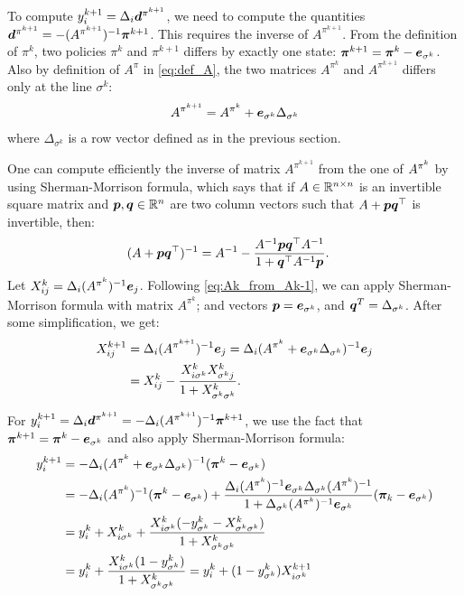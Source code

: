 \documentclass[acmsmall,screen,anonymous]{acmart}
\begin{document}
To compute $y^{k+1}_i=\Delta_{i}\boldsymbol{d}^{\pi^{k+1}}$, we need to compute the quantities $\boldsymbol{d}^{\pi^{k+1}} = -(A^{\pi^{k+1}})^{-1}\boldsymbol{\pi}^{k+1}$. This requires the inverse of ${A^{\pi^{k+1}}}$. From the definition of $\pi^k$, two policies $\pi^k$ and $\pi^{k+1}$ differs by exactly one state: $\boldsymbol{\pi}^{k+1}=\boldsymbol{\pi}^k - \boldsymbol{e}_{\sigma^k}$. Also by definition of $A^\pi$ in \eqref{eq:def_A}, the two matrices $A^{\pi^k}$ and $A^{\pi^{k+1}}$ differs only at the line $\sigma^k$:
\begin{align}
    A^{\pi^{k+1}} = A^{\pi^k} + \boldsymbol{e}_{\sigma^k} \Delta_{\sigma^k}
    \label{eq:Ak_from_Ak-1}
\end{align}
where $\Delta_{\sigma^k}$ is a row vector defined as in the previous section.

One can compute efficiently the inverse of matrix $A^{\pi^{k+1}}$ from the one of $A^{\pi^k}$ by using Sherman-Morrison formula, which says that if $A\in\mathbb{R}^{n\times n}$ is an invertible square matrix and $\boldsymbol{p}, \boldsymbol{q}\in\mathbb{R}^n$ are two column vectors such that $A+\boldsymbol{p}\boldsymbol{q}^\top$ is invertible, then: 
\begin{align*}
    (A + \boldsymbol{p}\boldsymbol{q}^\top)^{-1}
    &=A^{-1} - \frac{A^{-1}\boldsymbol{p}\boldsymbol{q}^\top A^{-1}}{1+\boldsymbol{q}^\top A^{-1}\boldsymbol{p}}.
\end{align*}
Let $X^k_{ij} = \Delta_i (A^{\pi^k})^{-1}\boldsymbol{e}_j$. Following \eqref{eq:Ak_from_Ak-1}, we can apply Sherman-Morrison formula with matrix $A^{\pi^k}$; and vectors $\boldsymbol{p}=\boldsymbol{e}_{\sigma^k}$, and $\boldsymbol{q}^T=\Delta_{\sigma^k}$. After some simplification, we get:
\begin{align}
    X^{k+1}_{ij} &= \Delta_i (A^{\pi^{k+1}})^{-1}\boldsymbol{e}_j =\Delta_i (A^{\pi^k}+\boldsymbol{e}_{\sigma^k}\Delta_{\sigma^k})^{-1}\boldsymbol{e}_j\nonumber\\
    &= X^{k}_{ij} - \frac{X^{k}_{i\sigma^k} X^{k}_{\sigma^k j}}{1+X^{k}_{\sigma^k \sigma^k}}.\label{eq:X^k+1-i}
\end{align}

For $y^{k+1}_i = \Delta_{i}\boldsymbol{d}^{\pi^{k+1}} = -\Delta_i(A^{\pi^{k+1}})^{-1} \boldsymbol{\pi}^{k+1}$, we use the fact that $\boldsymbol{\pi}^{k+1}=\boldsymbol{\pi}^k - \boldsymbol{e}_{\sigma^k}$ and also apply Sherman-Morrison formula:
\begin{align}
    y^{k+1}_i &= -\Delta_i(A^{\pi^{k}}+\boldsymbol{e}_{\sigma^k}\Delta_{\sigma^k})^{-1} (\boldsymbol{\pi}^k-\boldsymbol{e}_{\sigma^k})\nonumber\\
              &= -\Delta_i (A^{\pi^{k}})^{-1}(\boldsymbol{\pi}^k-\boldsymbol{e}_{\sigma^k})  + \frac{\Delta_i (A^{\pi^{k}})^{-1} \boldsymbol{e}_{\sigma^k}\Delta_{\sigma^k}(A^{\pi^{k}})^{-1}}{1 + \Delta_{\sigma^k} (A^{\pi^{k}})^{-1} \boldsymbol{e}_{\sigma^k}} (\boldsymbol{\pi}_k-\boldsymbol{e}_{\sigma^k})\nonumber\\
    &= y^k_i + X^k_{i\sigma^k} + \frac{X^k_{i\sigma^k}(-y^k_{\sigma^k} - X^{k}_{\sigma^k\sigma^k})}{1+X^{k}_{\sigma^k\sigma^k}}\nonumber\\
    &= y^k_i + \frac{X^k_{i\sigma^k}(1-y^k_{\sigma^k})}{1+X^{k}_{\sigma^k\sigma^k}} =y^k_i +(1-y^k_{\sigma^k})X^{k+1}_{i\sigma^k}\label{eq:y^k+1-i}
\end{align}
\end{document}
